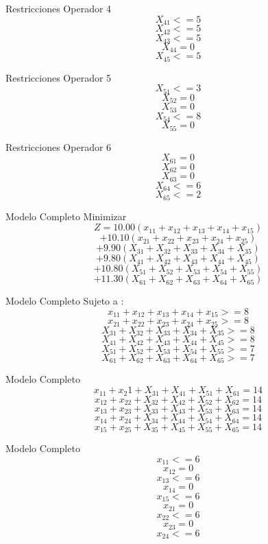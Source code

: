\documentclass{beamer}
\begin{document}
\begin{frame}[fragile]{Restricciones}
Operador 4\\
    \[X_{41} <= 5\]
    \[X_{42} <= 5\]
    \[X_{43} <= 5\]
    \[X_{44}  = 0\]
    \[X_{45} <= 5\]
\end{frame}
\begin{frame}[fragile]{Restricciones}
Operador 5\\
    \[X_{51} <= 3\]
    \[X_{52} = 0\]
    \[X_{53} = 0\]
    \[X_{54}  <=  8\]
    \[X_{55} = 0\]
\end{frame}
\begin{frame}[fragile]{Restricciones}
Operador 6\\
    \[X_{61} = 0 \]
    \[X_{62} = 0\]
    \[X_{63} = 0\]
    \[X_{64}  <=  6\]
    \[X_{65} <= 2\]

\end{frame}

\begin{frame}[fragile]{Modelo Completo}
Minimizar\\
    \[Z = 10.00 (x_{11} + x_{12} +x_{13}+x_{14} +x_{15}) \]
      \[+ 10.10 (x_{21} + x_{22} +x_{23}+x_{24} + x_{25})\]
      \[+  9.90 (X_{31} + X_{32} +X_{33}+X_{34} +X_{35})\]
      \[+ 9.80  (X_{41} + X_{42} +X_{43}+X_{44} +X_{45})\]
      \[+ 10.80  (X_{51} + X_{52} +X_{53}+X_{54} +X_{55})\]
      \[+ 11.30  (X_{61} + X_{62} +X_{63}+X_{64} +X_{65})\]

\end{frame}

\begin{frame}[fragile]{Modelo Completo}
Sujeto a :\\
\[x_{11} + x_{12} +x_{13}+x_{14} +x_{15} >=8\]
\[x_{21} + x_{22} +x_{23}+x_{24} + x_{25} >= 8\]
\[X_{31} + X_{32} +X_{33}+X_{34} +X_{35} >= 8\]
\[X_{41} + X_{42} +X_{43}+X_{44} +X_{45} >= 8\]
\[X_{51} + X_{52} +X_{53}+X_{54} +X_{55} >= 7\]
\[X_{61} + X_{62} +X_{63}+X_{64} +X_{65} >= 7\]
\end{frame}

\begin{frame}[fragile]{Modelo Completo}
\[x_{11} + x_{2}1 + X_{31} +X_{41} + X_{51} +X_{61} = 14  \]
\[x_{12} + x_{22} + X_{32} +X_{42} + X_{52} + X_{62} = 14\]
\[x_{13} + x_{23} + X_{33} +X_{43} + X_{53} +X_{63} = 14\]
\[x_{14} + x_{24} + X_{34} +X_{44} + X_{54} +X_{64} = 14\]
\[x_{15} + x_{25} + X_{35} +X_{45} + X_{55} +X_{65} = 14  \]
\end{frame}
\begin{frame}[fragile]{Modelo Completo}
\[x_{11} <= 6\]
        \[x_{12} = 0\]
        \[x_{13} <= 6\]
        \[x_{14}  = 0\]
        \[x_{15} <= 6\]
        \[x_{21} = 0 \]
        \[x_{22} <= 6\]
        \[x_{23} = 0\]
        \[x_{24}  <= 6\]
\end{frame}
\end{document}
